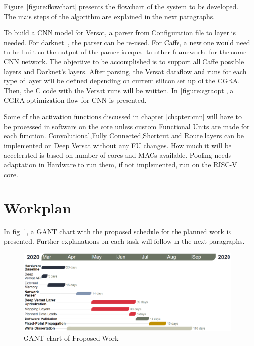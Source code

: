 Figure~\ref{figure:flowchart} presents the flowchart of the system to be developed. The mais steps
of the algorithm are explained in the next paragraphs.

To build a CNN model for Versat, a parser from Configuration file to layer is needed. For darknet~\cite{darknet}, the parser can be re-used.
For Caffe, a new one would need to be built so the output of the parser is equal to other frameworks for the same CNN network.
The objective to be accomplished is to support all Caffe possible layers and Darknet's layers.
After parsing, the Versat dataflow and runs for each type of layer will be defined depending on current silicon set up of the CGRA. Then,
the C code with the Versat runs will be written. In~\ref{figure:cgraopt}, a CGRA optimization flow for CNN is presented.

Some of the activation functions discussed in chapter \ref{chapter:cnn}
will have to be processed in software on the core unless custom Functional Units
are made for each function. Convolutional,Fully Connected,Shortcut and Route
layers can be implemented on Deep Versat without any FU changes. How much it
will be accelerated is based on number of cores and MACs available. Pooling
needs adaptation in Hardware to run them, if not implemented, run on the RISC-V
core.

\section{Workplan}

In fig~\ref{figure:gant}, a GANT chart with the proposed schedule for the
planned work is presented. Further explanations on each task will follow in the
next paragraphs.

\begin{figure}[!htbp]
    \includegraphics[width=1\textwidth]{Figures/gant2.png}
    \caption{GANT chart of Proposed Work}
    \label{figure:gant}
\end{figure}





